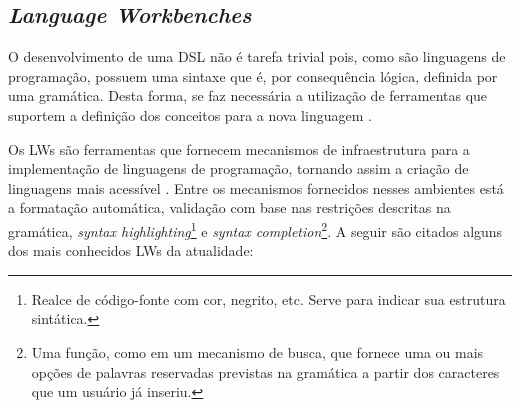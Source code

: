 \subsection{\textit{Language Workbenches}} \label{ssec:LW}

O desenvolvimento de uma \ac{DSL} não é tarefa trivial pois, como são linguagens de programação, possuem uma sintaxe que é, por consequência lógica, definida por uma gramática. 
Desta forma, se faz necessária a utilização de ferramentas que suportem a definição dos conceitos para a nova linguagem \cite{Fowler:2005}.

Os \acp{LW} são ferramentas que fornecem mecanismos de infraestrutura para a implementação de linguagens de programação, tornando assim a criação de linguagens mais acessível \cite{Wachsmuth:2014}. 
Entre os mecanismos fornecidos nesses ambientes está a formatação automática, validação com base nas restrições descritas na gramática, \textit{syntax highlighting}\footnote{Realce de código-fonte com cor, negrito, etc. Serve para indicar sua estrutura sintática.} e \textit{syntax completion}\footnote{Uma função, como em um mecanismo de busca, que fornece uma ou mais opções de palavras reservadas previstas na gramática a partir dos caracteres que um usuário já inseriu.}. 
A seguir são citados alguns dos mais conhecidos \acp{LW} da atualidade:

